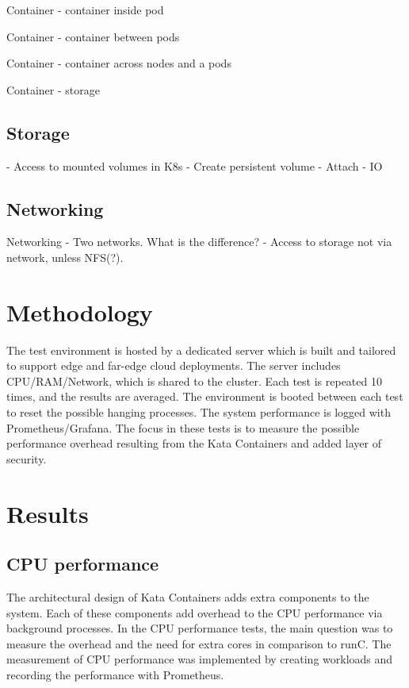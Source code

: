 Container - container inside pod

Container - container between pods

Container - container across nodes and a pods

Container - storage

\subsection{Storage}

- Access to mounted volumes in K8s
	- Create persistent volume
	- Attach
	- IO

\subsection{Networking}

Networking
    - Two networks. What is the difference?
    - Access to storage not via network, unless NFS(?).













\section{Methodology}

The test environment is hosted by a dedicated server which is built and tailored to support edge and far-edge cloud deployments. The server includes CPU/RAM/Network, which is shared to the cluster. Each test is repeated 10 times, and the results are averaged. The environment is booted between each test to reset the possible hanging processes. The system performance is logged with Prometheus/Grafana. The focus in these tests is to measure the possible performance overhead resulting from the Kata Containers and added layer of security.

\section{Results}

\subsection{CPU performance}

The architectural design of Kata Containers adds extra components to the system. Each of these components add overhead to the CPU performance via background processes. In the CPU performance tests, the main question was to measure the overhead and the need for extra cores in comparison to runC. The measurement of CPU performance was implemented by creating workloads and recording the performance with Prometheus. 

